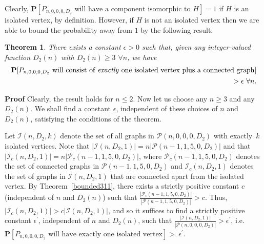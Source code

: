 \documentclass{article}
\newtheorem{Theorem}{Theorem}
\newtheorem{Proof of Theorem}{Proof of Theorem}
\begin{document}
\phantom{p}













Clearly, 
$\mathbf{P}[P_{n,0,0,0,D_{2}} \textrm{ will have a component isomorphic to }H]=1$
if $H$ is an isolated vertex,
by definition.
However, if $H$ is not an isolated vertex then
we are able to bound the probability away from $1$ by the following result:















\begin{Theorem} \label{bounded807}
There exists a constant $\epsilon>0$ such that,
given any integer-valued function $D_{2}(n)$ with $D_{2}(n) \geq 3$ $\forall n$,
we have
\begin{eqnarray*}
\mathbf{P}[P_{n,0,0,0,D_{2}} 
\textrm{ will consist of \emph{exactly} one isolated vertex plus a connected graph}] \\
> \epsilon 
\textrm{ } \forall n.
\end{eqnarray*}
\end{Theorem}
\textbf{Proof}
Clearly,
the result holds for $n \leq 2$.
Now let us choose any $n \geq 3$ and any $D_{2}(n)$.
We shall find a constant $\epsilon$,
independent of these choices of $n$ and $D_{2}(n)$,
satisfying the conditions of the theorem.

Let $\mathcal{I}(n,D_{2},k)$ denote the set of all graphs in $\mathcal{P}(n,0,0,0,D_{2})$
with exactly~$k$ isolated vertices.
Note that 
$|\mathcal{I}(n,D_{2},1)| = n|\mathcal{P}(n-1,1,5,0,D_{2})|$
and that 
$|\mathcal{I}_{c}(n,D_{2},1)| = n|\mathcal{P}_{c}(n-1,1,5,0,D_{2})|$,
where $\mathcal{P}_{c}(n-1,1,5,0,D_{2})$ denotes the set of connected graphs in $\mathcal{P}(n-1,1,5,0,D_{2})$
and $\mathcal{I}_{c}(n,D_{2},1)$ denotes the set of graphs in $\mathcal{I}(n,D_{2},1)$
that are connected apart from the isolated vertex.
By Theorem~\ref{bounded311},
there exists a strictly positive constant $c$
(independent of $n$ and $D_{2}(n)$)
such that
$\frac{ |\mathcal{P}_{c}(n-1,1,5,0,D_{2})| }{ |\mathcal{P}(n-1,1,5,0,D_{2})| } \!>\! c$.
Thus, $|\mathcal{I}_{c}(n,D_{2},1)| \!>\! c |\mathcal{I}(n,D_{2},1)|$,
and so it suffices to find a strictly positive constant $\epsilon^{\prime}$,
independent of $n$ and $D_{2}(n)$,
such that
$\frac{ |\mathcal{I}(n,D_{2},1)| }{ |\mathcal{P}(n,0,0,0,D_{2})| } \!>\! \epsilon^{\prime}$,
i.e.~$\mathbf{P}[P_{n,0,0,0,D_{2}} \textrm{ will have exactly one isolated vertex}] \!>~\!\!\epsilon^{\prime}$. \\
\end{document}
